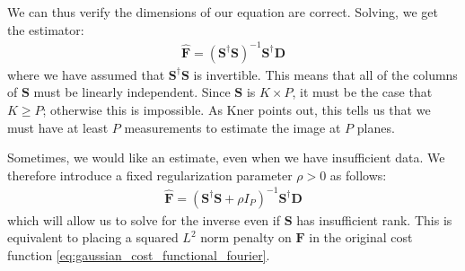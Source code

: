 \documentclass{article}
\begin{document}
We can thus verify the dimensions of our equation are correct. Solving, we get the estimator:
\begin{align}
\hat{\mathbf{F}} = (\mathbf{S}^\dagger \mathbf{S})^{-1} \mathbf{S}^\dagger \mathbf{D}
\end{align}
where we have assumed that $\mathbf{S}^\dagger \mathbf{S}$ is invertible. This means that all of the columns of $\mathbf{S}$ must be linearly independent. Since $\mathbf{S}$ is $K \times P$, it must be the case that $K \ge P$; otherwise this is impossible. As Kner points out, this tells us that we must have at least $P$ measurements to estimate the image at $P$ planes.

Sometimes, we would like an estimate, even when we have insufficient data. We therefore introduce a fixed regularization parameter $\rho>0$ as follows:
\begin{align}
\hat{\mathbf{F}} = (\mathbf{S}^\dagger \mathbf{S} + \rho I_{P})^{-1} \mathbf{S}^\dagger \mathbf{D}
\label{eq:regularized_F}
\end{align}
which will allow us to solve for the inverse even if $\mathbf{S}$ has insufficient rank. This is equivalent to placing a squared $L^2$ norm penalty on $\mathbf{F}$ in the original cost function \autoref{eq:gaussian_cost_functional_fourier}.
\end{document}
